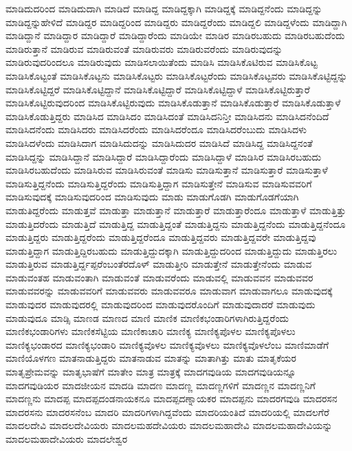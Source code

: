 {ಮಾಡಿದುದರಿಂದ
ಮಾಡಿದುದಾಗಿ
ಮಾಡಿದೆ
ಮಾಡಿದ್ದ
ಮಾಡಿದ್ದಕ್ಕಾಗಿ
ಮಾಡಿದ್ದಕ್ಕೆ
ಮಾಡಿದ್ದನೆಂದು
ಮಾಡಿದ್ದನ್ನು
ಮಾಡಿದ್ದನ್ನುಹೇಳಿದೆ
ಮಾಡಿದ್ದರ
ಮಾಡಿದ್ದರಿಂದ
ಮಾಡಿದ್ದರು
ಮಾಡಿದ್ದರೆಂದು
ಮಾಡಿದ್ದಲಿ
ಮಾಡಿದ್ದಳೆಂದು
ಮಾಡಿದ್ದಾಗಿ
ಮಾಡಿದ್ದಾನೆ
ಮಾಡಿದ್ದಾರ
ಮಾಡಿದ್ದಾರೆ
ಮಾಡಿದ್ದಾರೆಂದು
ಮಾಡಿಯೇ
ಮಾಡಿರ
ಮಾಡಿರಬಹುದು
ಮಾಡಿರಬಹುದೆಂದು
ಮಾಡಿರುತ್ತಾನೆ
ಮಾಡಿರುವ
ಮಾಡಿರುವಂತೆ
ಮಾಡಿರುವರು
ಮಾಡಿರುವರೆಂದು
ಮಾಡಿರುವುದನ್ನು
ಮಾಡಿರುವುದರಿಂದಲೂ
ಮಾಡಿರುವುದು
ಮಾಡಿಸಲಾಯಿತೆಂದು
ಮಾಡಿಸಿ
ಮಾಡಿಸಿಕೊಟಿರುವ
ಮಾಡಿಸಿಕೊಟ್ಟ
ಮಾಡಿಸಿಕೊಟ್ಟಂತೆ
ಮಾಡಿಸಿಕೊಟ್ಟನು
ಮಾಡಿಸಿಕೊಟ್ಟರು
ಮಾಡಿಸಿಕೊಟ್ಟರೆಂದು
ಮಾಡಿಸಿಕೊಟ್ಟವರು
ಮಾಡಿಸಿಕೊಟ್ಟಿದ್ದನ್ನು
ಮಾಡಿಸಿಕೊಟ್ಟಿದ್ದರೆ
ಮಾಡಿಸಿಕೊಟ್ಟಿದ್ದಾನೆ
ಮಾಡಿಸಿಕೊಟ್ಟಿದ್ದಾರೆ
ಮಾಡಿಸಿಕೊಟ್ಟಿದ್ದಾಳೆ
ಮಾಡಿಸಿಕೊಟ್ಟಿರುತ್ತಾರೆ
ಮಾಡಿಸಿಕೊಟ್ಟಿರುವುದರಿಂದ
ಮಾಡಿಸಿಕೊಟ್ಟಿರುವುದು
ಮಾಡಿಸಿಕೊಡುತ್ತಾನೆ
ಮಾಡಿಸಿಕೊಡುತ್ತಾರೆ
ಮಾಡಿಸಿಕೊಡುತ್ತಾಳೆ
ಮಾಡಿಸಿಕೊಡುತ್ತಿದ್ದರು
ಮಾಡಿಸಿದ
ಮಾಡಿಸಿದಂ
ಮಾಡಿಸಿದಂತೆ
ಮಾಡಿಸಿದನಿನ್ತೀ
ಮಾಡಿಸಿದನು
ಮಾಡಿಸಿದನೆಂದಿದೆ
ಮಾಡಿಸಿದನೆಂದು
ಮಾಡಿಸಿದರು
ಮಾಡಿಸಿದರೆಂದು
ಮಾಡಿಸಿದರೆಂದೂ
ಮಾಡಿಸಿದರೆಂಬುದು
ಮಾಡಿಸಿದಳು
ಮಾಡಿಸಿದಳೆಂದು
ಮಾಡಿಸಿದಾಗ
ಮಾಡಿಸಿದುದನ್ನು
ಮಾಡಿಸಿದುದರ
ಮಾಡಿಸಿದೆ
ಮಾಡಿಸಿದ್ದ
ಮಾಡಿಸಿದ್ದನಂತೆ
ಮಾಡಿಸಿದ್ದನ್ನು
ಮಾಡಿಸಿದ್ದಾನೆ
ಮಾಡಿಸಿದ್ದಾರೆ
ಮಾಡಿಸಿದ್ದಾರೆಂದು
ಮಾಡಿಸಿದ್ದಾಳೆ
ಮಾಡಿಸಿರ
ಮಾಡಿಸಿರಬಹುದು
ಮಾಡಿಸಿರಬಹುದೆಂದು
ಮಾಡಿಸಿರುವ
ಮಾಡಿಸಿರುವಂತೆ
ಮಾಡಿಸು
ಮಾಡಿಸುತ್ತಾನೆ
ಮಾಡಿಸುತ್ತಾರೆ
ಮಾಡಿಸುತ್ತಾಳೆ
ಮಾಡಿಸುತ್ತಿದ್ದನೆಂದು
ಮಾಡಿಸುತ್ತಿದ್ದರೆಂದು
ಮಾಡಿಸುತ್ತಿದ್ದಾಗ
ಮಾಡಿಸುತ್ತೇನೆ
ಮಾಡಿಸುವ
ಮಾಡಿಸುವವರಿಗೆ
ಮಾಡಿಸುವುದಕ್ಕೆ
ಮಾಡಿಸುವುದರಿಂದ
ಮಾಡಿಸುವುದು
ಮಾಡು
ಮಾಡುಗೊಡಗಿ
ಮಾಡುಗೊಡಗೆಯಾಗಿ
ಮಾಡುತಿದ್ದರೆಂದು
ಮಾಡುತ್ತವೆ
ಮಾಡುತ್ತಾ
ಮಾಡುತ್ತಾನೆ
ಮಾಡುತ್ತಾರೆ
ಮಾಡುತ್ತಾರೆಂದೂ
ಮಾಡುತ್ತಾಳೆ
ಮಾಡುತ್ತಿತ್ತು
ಮಾಡುತ್ತಿದರೆಂದು
ಮಾಡುತ್ತಿದೆ
ಮಾಡುತ್ತಿದ್ದ
ಮಾಡುತ್ತಿದ್ದಂತೆ
ಮಾಡುತ್ತಿದ್ದನು
ಮಾಡುತ್ತಿದ್ದನೆಂದು
ಮಾಡುತ್ತಿದ್ದನೆಂದೂ
ಮಾಡುತ್ತಿದ್ದರು
ಮಾಡುತ್ತಿದ್ದರೆಂದು
ಮಾಡುತ್ತಿದ್ದರೆಂದೂ
ಮಾಡುತ್ತಿದ್ದವರು
ಮಾಡುತ್ತಿದ್ದವರೇ
ಮಾಡುತ್ತಿದ್ದವು
ಮಾಡುತ್ತಿದ್ದಾಗ
ಮಾಡುತ್ತಿದ್ದಿರಬಹುದು
ಮಾಡುತ್ತಿದ್ದುದಕ್ಕಾಗಿ
ಮಾಡುತ್ತಿದ್ದುದರಿಂದ
ಮಾಡುತ್ತಿದ್ದುದು
ಮಾಡುತ್ತಿರಲು
ಮಾಡುತ್ತಿರುವ
ಮಾಡುತ್ತಿರ್ದ್ದಪ್ಪರೆಂಬಂತೆರದೊಳ್
ಮಾಡುತ್ತೀರಿ
ಮಾಡುತ್ತೇನೆ
ಮಾಡುತ್ತೇನೆಂದು
ಮಾಡುವ
ಮಾಡುವಂತಹ
ಮಾಡುವಂತಾಗಿ
ಮಾಡುವಂತೆ
ಮಾಡುವರೆಂದು
ಮಾಡುವಲ್ಲಿ
ಮಾಡುವವನ
ಮಾಡುವವರ
ಮಾಡುವವರನ್ನು
ಮಾಡುವವರಿಗೆ
ಮಾಡುವವರು
ಮಾಡುವವರೂ
ಮಾಡುವಾಗ
ಮಾಡುವಾಗಲೂ
ಮಾಡುವುದಕ್ಕೆ
ಮಾಡುವುದರ
ಮಾಡುವುದರಲ್ಲಿ
ಮಾಡುವುದರಿಂದ
ಮಾಡುವುದರೊಂದಿಗೆ
ಮಾಡುವುದಾದರೆ
ಮಾಡುವುದು
ಮಾಡುವುದೂ
ಮಾಡ್ಸಿ
ಮಾಣಡ
ಮಾಣದ
ಮಾಣಿ
ಮಾಣಿಕ
ಮಾಣಿಕಭಂಡಾರಿಗಳಾಗಿರುತ್ತಿದ್ದರೆಂದು
ಮಾಣಿಕಭಂಡಾರಿಗಳು
ಮಾಣಿಕಸೆಟ್ಟಿಯ
ಮಾಣಿಕಾಚಾರಿ
ಮಾಣಿಕ್ಯ
ಮಾಣಿಕ್ಯಪೊಳಲ
ಮಾಣಿಕ್ಯಪೊಳಲು
ಮಾಣಿಕ್ಯಭಂಡಾರದ
ಮಾಣಿಕ್ಯಭಂಡಾರಿ
ಮಾಣಿಕ್ಯವೊಳಲ
ಮಾಣಿಕ್ಯವೊಳಲು
ಮಾಣಿಕ್ಯವೊಳಲೆಂಬ
ಮಾಣಿಮಾಡೆಗೆ
ಮಾಣಿಯೊಳಗಣ
ಮಾತನಾಡುತ್ತಿದ್ದರು
ಮಾತನಾಡುವ
ಮಾತನ್ನು
ಮಾತಾಗಿತ್ತು
ಮಾತು
ಮಾತೃಕೆಯರ
ಮಾತೃಪ್ರೇಮವನ್ನು
ಮಾತೃಭಾಷೆಗೆ
ಮಾತೇಂ
ಮಾತ್ರ
ಮಾತ್ರಕ್ಕೆ
ಮಾದಗವುಡಿಯ
ಮಾದಗವುಡಿಯನ್ನೂ
ಮಾದಗವುಡಿಯರ
ಮಾದಜೀಯನ
ಮಾದಡಿ
ಮಾದಣ
ಮಾದಣ್ಣ
ಮಾದಣ್ಣಗಳಿಗೆ
ಮಾದಣ್ಣನ
ಮಾದಣ್ಣನಿಗೆ
ಮಾದಣ್ಣನು
ಮಾದಪ್ಪ
ಮಾದಪ್ಪದಂಡನಾಯಕನೂ
ಮಾದಪ್ಪದಣ್ನಾಯಕರ
ಮಾದಪ್ಪನು
ಮಾದರಗವುಡಿ
ಮಾದರಸನ
ಮಾದರಸನು
ಮಾದರಸನೆಂಬ
ಮಾದರಿ
ಮಾದರಿಗಳಾಗಿದ್ದವೆಂದು
ಮಾದರಿಯಂತಿದೆ
ಮಾದರಿಯಲ್ಲಿ
ಮಾದಲಗೆರೆ
ಮಾದಲದೇವಿ
ಮಾದಲದೇವಿಯರು
ಮಾದಲಮಹದೇವಿಯರು
ಮಾದಲಮಹಾದೇವಿ
ಮಾದಲಮಹಾದೇವಿಯನ್ನು
ಮಾದಲಮಹಾದೇವಿಯರು
ಮಾದಲೇಶ್ವರ
}
